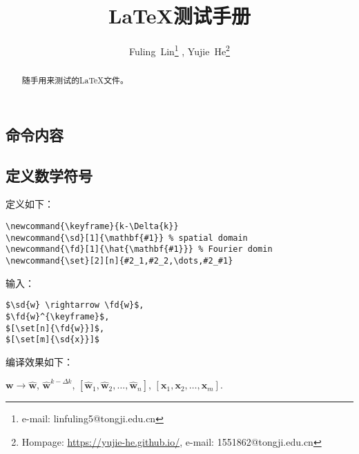 \documentclass{article}
\title{\LaTeX 测试手册}
\date{}
\author{Fuling~Lin\thanks{e-mail: linfuling5@tongji.edu.cn} ,
	Yujie~He\thanks{Hompage: \url{https://yujie-he.github.io/}, e-mail: 1551862@tongji.edu.cn}
}
\newcommand{\keyframe}{k-\Delta{k}}
\newcommand{\sd}[1]{\mathbf{#1}} %
\newcommand{\fd}[1]{\hat{\mathbf{#1}}} %
\newcommand{\set}[2][n]{#2_1,#2_2,\dots,#2_#1}
\begin{document}
\begin{CJK}{UTF8}{gkai}


\maketitle
\begin{abstract}
随手用来测试的\LaTeX 文件。
\end{abstract}

\section{命令内容}



\subsection{定义数学符号}

定义如下：
\begin{lstlisting}
\newcommand{\keyframe}{k-\Delta{k}}
\newcommand{\sd}[1]{\mathbf{#1}} % spatial domain
\newcommand{\fd}[1]{\hat{\mathbf{#1}}} % Fourier domin
\newcommand{\set}[2][n]{#2_1,#2_2,\dots,#2_#1}
\end{lstlisting}

输入：
\begin{lstlisting}
$\sd{w} \rightarrow \fd{w}$,
$\fd{w}^{\keyframe}$,
$[\set[n]{\fd{w}}]$,
$[\set[m]{\sd{x}}]$
\end{lstlisting}

编译效果如下：

$\sd{w} \rightarrow \fd{w}$,
$\fd{w}^{\keyframe}$,
$[\set[n]{\fd{w}}]$,
$[\set[m]{\sd{x}}]$.


\end{CJK}
\end{document}
